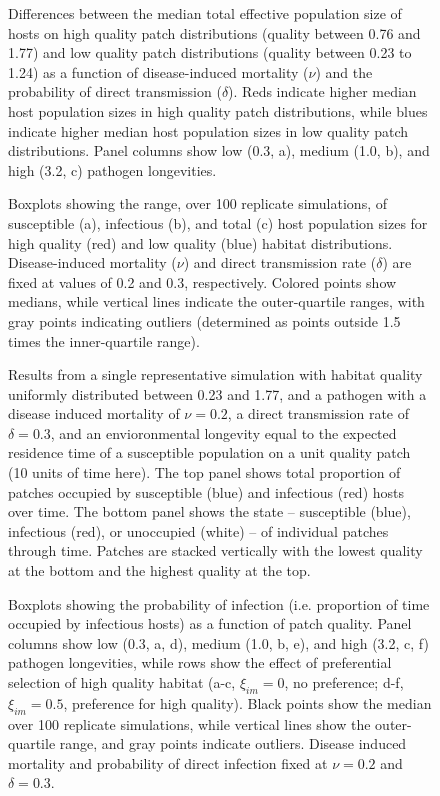 \documentclass{article}
\begin{document}
\begin{figure}
\centering
\caption{Differences between the median total effective population size of hosts on high quality patch distributions (quality between 0.76 and 1.77) and low quality patch distributions (quality between 0.23 to 1.24) as a function of disease-induced mortality ($\nu$) and the probability of direct transmission ($\delta$).  Reds indicate higher median host population sizes in high quality patch distributions, while blues indicate higher median host population sizes in low quality patch distributions.  Panel columns show low (0.3, a), medium (1.0, b), and high (3.2, c) pathogen longevities.}
\label{highvlow}
\end{figure}

\begin{figure}
\centering
\caption{Boxplots showing the range, over 100 replicate simulations, of susceptible (a), infectious (b), and total (c) host population sizes for high quality (red) and low quality (blue) habitat distributions.  Disease-induced mortality ($\nu$) and direct transmission rate ($\delta$) are fixed at values of 0.2 and 0.3, respectively.  Colored points show medians, while vertical lines indicate the outer-quartile ranges, with gray points indicating outliers (determined as points outside 1.5 times the inner-quartile range).}
\label{popsizes}
\end{figure}

\begin{figure}
\centering
\caption{Results from a single representative simulation with habitat quality uniformly distributed between 0.23 and 1.77, and a pathogen with a disease induced mortality of $\nu = 0.2$, a direct transmission rate of $\delta = 0.3$, and an envioronmental longevity equal to the expected residence time of a susceptible population on a unit quality patch (10 units of time here).  The top panel shows total proportion of patches occupied by susceptible (blue) and infectious (red) hosts over time.  The bottom panel shows the state -- susceptible (blue), infectious (red), or unoccupied (white) -- of individual patches through time.  Patches are stacked vertically with the lowest quality at the bottom and the highest quality at the top.}
\label{simvis}
\end{figure}


\begin{figure}
\centering
\caption{Boxplots showing the probability of infection (i.e. proportion of time occupied by infectious hosts) as a function of patch quality.  Panel columns show low (0.3, a, d), medium (1.0, b, e), and high (3.2, c, f) pathogen longevities, while rows show the effect of preferential selection of high quality habitat (a-c, $\xi_{im} = 0$,  no preference; d-f, $\xi_{im} = 0.5$, preference for high quality).  Black points show the median over 100 replicate simulations, while vertical lines show the outer-quartile range, and gray points indicate outliers. Disease induced mortality and probability of direct infection fixed at $\nu = 0.2$ and $\delta = 0.3$.}
\label{pinfection}
\end{figure}
\end{document}
